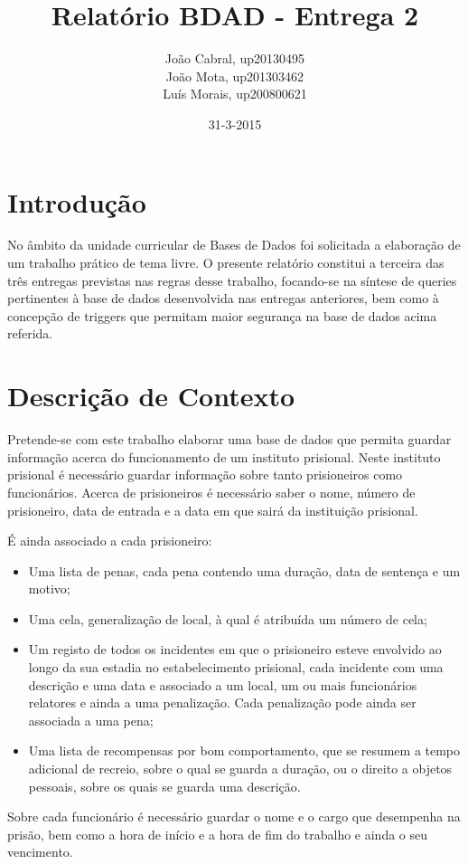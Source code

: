 \documentclass{article}
\title{Relatório BDAD - Entrega 2}
\date{31-3-2015}
\author{João Cabral, up20130495\\
	   João Mota, up201303462\\
	   Luís Morais, up200800621\\}
\begin{document}
\maketitle
{}
\newpage
{}
\renewcommand*\contentsname{Sumário}
\tableofcontents
\newpage
\section{Introdução}
No âmbito da unidade curricular de Bases de Dados foi solicitada a elaboração de um
trabalho prático de tema livre. O presente relatório constitui a terceira das três entregas
previstas nas regras desse trabalho, focando-se na síntese de queries pertinentes à 
base de dados desenvolvida nas entregas anteriores, bem como
à concepção de triggers que permitam maior segurança na base de dados acima referida.


\section{Descrição de Contexto}
Pretende-se com este trabalho elaborar uma base de dados que permita guardar
informação acerca do funcionamento de um instituto prisional. Neste instituto prisional é
necessário guardar informação sobre tanto prisioneiros como funcionários.
Acerca de prisioneiros é necessário saber o nome, número de prisioneiro, data de entrada
e a data em que sairá da instituição prisional.

É ainda associado a cada prisioneiro:
\begin{itemize}
\item Uma lista de penas, cada pena contendo uma duração, data de sentença e um motivo;
\item Uma cela, generalização de local, à qual é atribuída um número de cela;
\item Um registo de todos os incidentes em que o prisioneiro esteve envolvido ao longo da sua estadia no estabelecimento prisional, cada incidente com uma descrição e uma data e associado a um local, um ou mais funcionários relatores e ainda a uma penalização. Cada penalização pode ainda ser associada a uma pena;
\item Uma lista de recompensas por bom comportamento, que se resumem a tempo adicional de recreio, sobre o qual se guarda a duração, ou o direito a objetos pessoais, sobre os quais se guarda uma descrição.
\end{itemize}
Sobre cada funcionário é necessário guardar o nome e o cargo que desempenha na prisão, bem como a hora de início e a hora de fim do trabalho e ainda o seu vencimento.
\newpage
\end{document}
